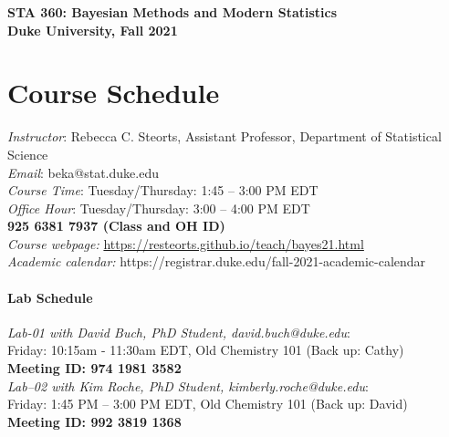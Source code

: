 \documentclass[11pt]{article}
\date{}
\begin{document}
\begin{center}
{\Large\bf STA 360: Bayesian Methods and Modern Statistics} \\

{\Large\bf Duke University, Fall 2021} \\
\end{center}


\section{Course Schedule}
\emph{Instructor}: Rebecca C. Steorts,  Assistant Professor,  Department of Statistical Science\\
\emph{Email}: beka@stat.duke.edu\\
\emph{Course Time}: Tuesday/Thursday: 1:45 -- 3:00 PM EDT \\
\emph{Office Hour}: Tuesday/Thursday: 3:00 -- 4:00 PM EDT \\
\textbf{925 6381 7937 (Class and OH ID)}\\
\emph{Course webpage:} \url{https://resteorts.github.io/teach/bayes21.html} \\
\emph{Academic calendar:} https://registrar.duke.edu/fall-2021-academic-calendar


\paragraph{Lab Schedule}
\emph{Lab-01 with David Buch, PhD Student, david.buch@duke.edu}: \\Friday: 10:15am - 11:30am EDT, Old Chemistry 101 (Back up: Cathy) \\
\textbf{Meeting ID: 974 1981 3582}\\
\emph{Lab--02 with Kim Roche, PhD Student, kimberly.roche@duke.edu}: \\Friday: 1:45 PM -- 3:00 PM EDT, Old Chemistry 101 (Back up: David) \\
\textbf{Meeting ID: 992 3819 1368}
\end{document}
